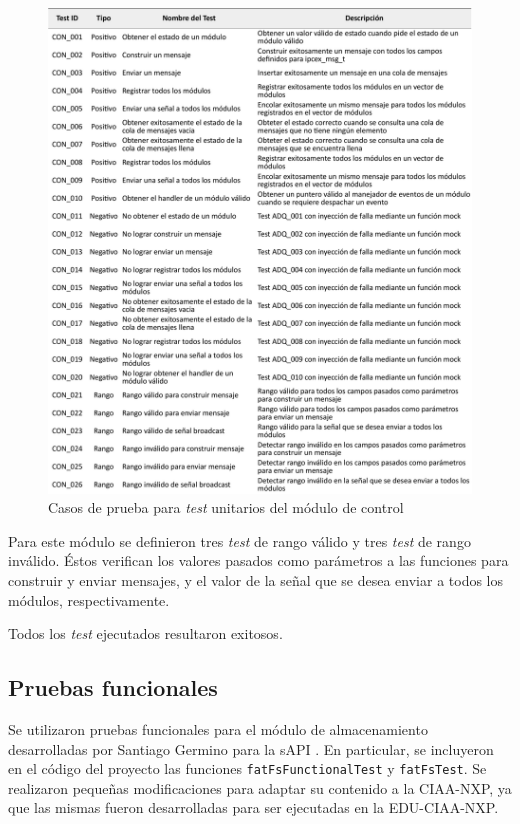 \begin{figure}[!htpb]
	\centering
	\includegraphics[width=\textwidth]{./Figures/TestCON.pdf}
	\caption{Casos de prueba para \textit{test} unitarios del módulo de control}
	\label{fig:test_control}
\end{figure}

Para este módulo se definieron tres \textit{test} de rango válido y tres \textit{test} de rango inválido. Éstos verifican los valores pasados como parámetros a las funciones para construir y enviar mensajes, y el valor de la señal que se desea enviar a todos los módulos, respectivamente.

Todos los \textit{test} ejecutados resultaron exitosos.

\subsection{Pruebas funcionales}
\label{subsec:pruebasFuncionales}

Se utilizaron pruebas funcionales para el módulo de almacenamiento desarrolladas por Santiago Germino para la sAPI \citep{pruebasfuncionales}.  En particular, se incluyeron en el código del proyecto las funciones \texttt{fatFsFunctionalTest} y \texttt{fatFsTest}. Se realizaron pequeñas modificaciones para adaptar su contenido a la CIAA-NXP, ya que las mismas fueron desarrolladas para ser ejecutadas en la EDU-CIAA-NXP.

